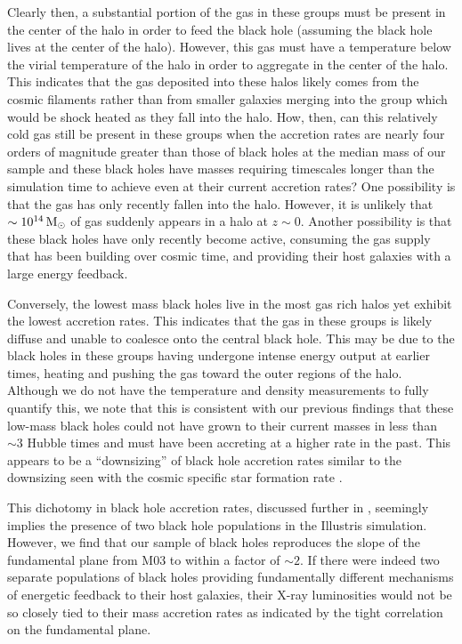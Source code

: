 Clearly then, a substantial portion of the gas in these groups must
be present in the center of the halo in order to feed the black hole
(assuming the black hole lives at the center of the halo). However,
this gas must have a temperature below the virial temperature of the
halo in order to aggregate in the center of the halo. This indicates
that the gas deposited into these halos likely comes from the cosmic
filaments rather than from smaller galaxies merging into the group
which would be shock heated as they fall into the halo. How, then,
can this relatively cold gas still be present in these groups when
the accretion rates are nearly four orders of magnitude greater than
those of black holes at the median mass of our sample and these black
holes have masses requiring timescales longer than the simulation
time to achieve even at their current accretion rates? One possibility
is that the gas has only recently fallen into the halo. However, it
is unlikely that $\sim10^{14}\,{\rm M_{\odot}}$ of gas suddenly appears
in a halo at $z\sim0$. Another possibility is that these black holes
have only recently become active, consuming the gas supply that has
been building over cosmic time, and providing their host galaxies
with a large energy feedback.

Conversely, the lowest mass black holes live in the most gas rich
halos yet exhibit the lowest accretion rates. This indicates that
the gas in these groups is likely diffuse and unable to coalesce onto
the central black hole. This may be due to the black holes in these
groups having undergone intense energy output at earlier times, heating
and pushing the gas toward the outer regions of the halo. Although
we do not have the temperature and density measurements to fully quantify
this, we note that this is consistent with our previous findings that
these low-mass black holes could not have grown to their current masses
in less than $\sim3$ Hubble times and must have been accreting at
a higher rate in the past. This appears to be a ``downsizing'' of
black hole accretion rates similar to the downsizing seen with the
cosmic specific star formation rate \citep{damen2009theevolution}.

This dichotomy in black hole accretion rates, discussed further in
\citet{sijacki2014theillustris}, seemingly implies the presence of
two black hole populations in the Illustris simulation. However, we
find that our sample of black holes reproduces the slope of the fundamental
plane from M03 to within a factor of $\sim2$. If there were indeed
two separate populations of black holes providing fundamentally different
mechanisms of energetic feedback to their host galaxies, their X-ray
luminosities would not be so closely tied to their mass accretion
rates as indicated by the tight correlation on the fundamental plane.

